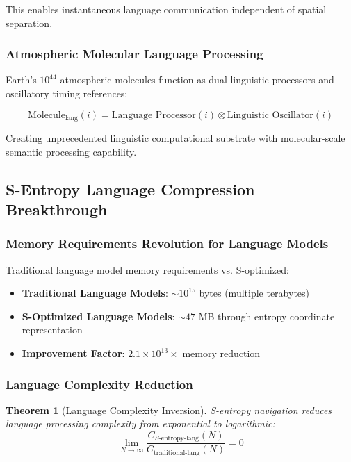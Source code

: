 \documentclass[12pt,a4paper]{article}
\newtheorem{theorem}{Theorem}
\begin{document}
This enables instantaneous language communication independent of spatial separation.

\subsubsection{Atmospheric Molecular Language Processing}

Earth's $10^{44}$ atmospheric molecules function as dual linguistic processors and oscillatory timing references:

\begin{equation}
\text{Molecule}_{\text{lang}}(i) = \text{Language Processor}(i) \otimes \text{Linguistic Oscillator}(i)
\end{equation}

Creating unprecedented linguistic computational substrate with molecular-scale semantic processing capability.

\subsection{S-Entropy Language Compression Breakthrough}

\subsubsection{Memory Requirements Revolution for Language Models}

Traditional language model memory requirements vs. S-optimized:

\begin{itemize}
\item \textbf{Traditional Language Models}: $\sim 10^{15}$ bytes (multiple terabytes)
\item \textbf{S-Optimized Language Models}: $\sim 47$ MB through entropy coordinate representation
\item \textbf{Improvement Factor}: $2.1 \times 10^{13}\times$ memory reduction
\end{itemize}

\subsubsection{Language Complexity Reduction}

\begin{theorem}[Language Complexity Inversion]
S-entropy navigation reduces language processing complexity from exponential to logarithmic:
\begin{equation}
\lim_{N \rightarrow \infty} \frac{C_{S\text{-entropy-lang}}(N)}{C_{\text{traditional-lang}}(N)} = 0
\end{equation}
\end{theorem}
\end{document}
